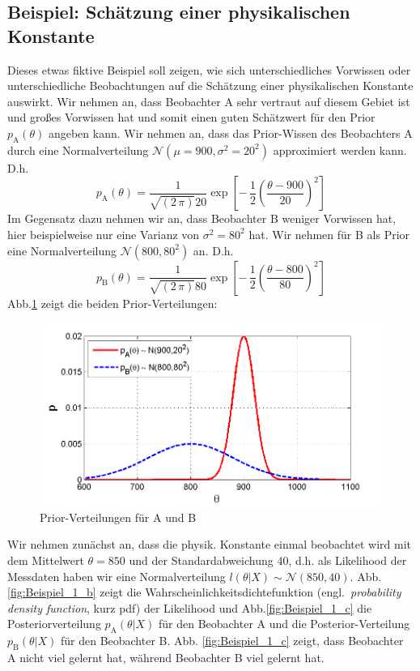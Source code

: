 \subsection{Beispiel: Schätzung einer physikalischen Konstante}
Dieses etwas fiktive Beispiel soll zeigen, wie sich unterschiedliches Vorwissen oder unterschiedliche Beobachtungen auf die Schätzung einer physikalischen Konstante auswirkt. 
Wir nehmen an, dass Beobachter A sehr vertraut auf diesem Gebiet ist und 
großes Vorwissen hat und somit einen guten Schätzwert für den Prior $p_\mathrm{A}(\theta)$ angeben kann. Wir nehmen an, dass das Prior-Wissen des Beobachters A durch eine Normalverteilung $\mathcal{N}(\mu = 900, \sigma^2=20^2)$ approximiert werden 
kann. D.h. 
\[
p_\mathrm{A}(\theta) = \frac{1}{\sqrt{(2\,\pi)} 20} \exp \left[ -\, \frac{1}{2}
\left(\frac{\theta -900}{20} 
\right)^2 \right] 
\]
Im Gegensatz dazu nehmen wir an, dass Beobachter B weniger Vorwissen 
hat, hier beispielweise nur eine Varianz von $\sigma^2 = 80^2$ hat.
Wir nehmen für B als Prior eine Normalverteilung $\mathcal{N}(800,80^2)$ an.
D.h.
\[ 
p_\mathrm{B}(\theta) = \frac{1}{\sqrt{(2\,\pi)} 80} \exp \left[ -\, \frac{1}{2}
\left(\frac{\theta -800}{80} 
\right)^2 \right] 
\]
Abb.\ref{fig:Beispiel_1_a} zeigt die beiden Prior-Verteilungen:
\begin{figure}[!h]
	\begin{center}
		\includegraphics[width=130mm]{08_vorlesung/media/prior_A_Prior_B.png}
		\caption{\label{fig:Beispiel_1_a} Prior-Verteilungen für A und B}
	\end{center}
\end{figure}
Wir nehmen zunächst an, dass die physik. Konstante einmal beobachtet wird mit 
dem Mittelwert $\theta = 850$ und der Standardabweichung 40, d.h. 
als Likelihood der Messdaten haben wir eine Normalverteilung $l(\theta|X) \sim \mathcal{N}(850,40)$.
Abb.\ref{fig:Beispiel_1_b} zeigt die Wahrscheinlichkeitsdichtefunktion (engl.\ \textsl{probability density function}, kurz pdf) der Likelihood und Abb.\ref{fig:Beispiel_1_c} 
die Posteriorverteilung $p_\mathrm{A}(\theta|X)$ für den Beobachter A und die Posterior-Verteilung $p_\mathrm{B}(\theta|X)$ für den Beobachter B. Abb. \ref{fig:Beispiel_1_c} 
zeigt, dass Beobachter A nicht viel gelernt hat, während Beobachter B viel gelernt hat.


